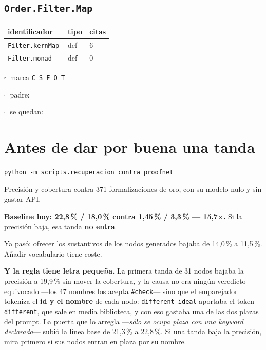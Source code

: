\documentclass[10pt,a4paper]{article}
\begin{document}
\subsection*{\texttt{Order.Filter.Map}}
\noindent\begin{minipage}{0.56\linewidth}\small\begin{tabular}{@{}>{\raggedright\arraybackslash}p{0.58\linewidth}ll@{}}\toprule
identificador & tipo & citas\\\midrule
\texttt{Filter.\allowbreak{}kernMap} & def & 6\\
\texttt{Filter.\allowbreak{}monad} & def & 0\\
\bottomrule\end{tabular}\end{minipage}\hfill\begin{minipage}{0.40\linewidth}\small$\square$~marca \texttt{C S F O T}\par\smallskip$\square$~padre: \dotfill\par\smallskip$\square$~se quedan: \dotfill\par\end{minipage}\par\medskip
\section*{Antes de dar por buena una tanda}

\begin{marca}
\noindent\texttt{python -m scripts.recuperacion\_contra\_proofnet}\par\smallskip
Precisión y cobertura contra 371 formalizaciones de oro, con su modelo nulo y
sin gastar API.\par\medskip
\textbf{Baseline hoy: 22,8\,\% / 18,0\,\% contra 1,45\,\% / 3,3\,\% —
15,7$\times$.} Si la precisión baja, esa tanda \textbf{no entra}.\par\medskip
Ya pasó: ofrecer los sustantivos de los nodos generados bajaba de 14,0\,\% a
11,5\,\%. Añadir vocabulario tiene coste.\par\medskip
\textbf{Y la regla tiene letra pequeña.} La primera tanda de 31 nodos bajaba
la precisión a 19,9\,\% sin mover la cobertura, y la causa no era ningún
veredicto equivocado —los 47 nombres los acepta \texttt{\#check}— sino que el
emparejador tokeniza el \textbf{id y el nombre} de cada nodo:
\texttt{different-\allowbreak{}ideal} aportaba el token \texttt{different},
que sale en media biblioteca, y con eso gastaba una de las dos plazas del
prompt. La puerta que lo arregla —\emph{sólo se ocupa plaza con una keyword
declarada}— subió la línea base de 21,3\,\% a 22,8\,\%. Si una tanda baja la
precisión, mira primero si sus nodos entran en plaza por su nombre.
\end{marca}
\end{document}
